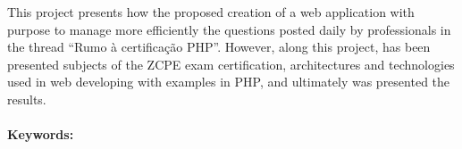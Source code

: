 \begin{singlespace}
\noindent 
This project presents how the proposed creation of a web application with
purpose to manage more efficiently the questions posted daily by professionals 
in the thread ``Rumo à certificação PHP''.  
However, along this project, has been presented subjects of the \acs{ZCPE} exam 
certification, architectures and technologies used in web developing with 
examples in \acs{PHP}, and ultimately was presented the results.\\\\
\textbf{Keywords:} \textsf{\enUSKeyword}
\end{singlespace}